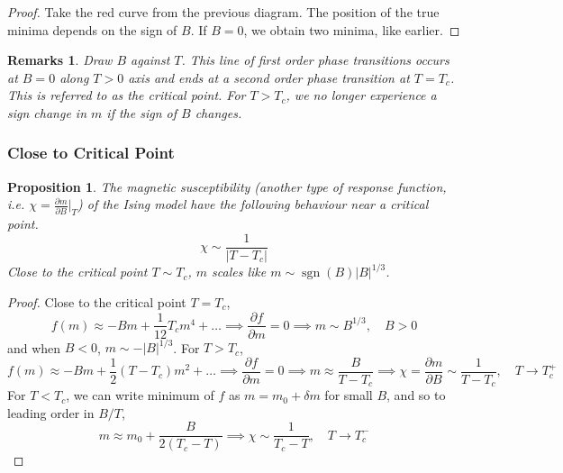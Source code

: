 \documentclass[a4paper]{article}
\DeclareMathOperator{\sgn}{sgn}
\newtheorem{remarks}{Remarks}[section]
\theoremstyle{new}
\newtheorem{prop}{Proposition}[section]
\begin{document}
\begin{proof}
Take the red curve from the previous diagram. The position of the true minima depends on the sign of $B$. If $B=0$, we obtain two minima, like earlier.
\end{proof}
\begin{remarks}
Draw $B$ against $T$. This line of first order phase transitions occurs at $B=0$ along $T>0$ axis and ends at a second order phase transition at $T = T_c$. This is referred to as the critical point. For $T>T_c$, we no longer experience a sign change in $m$ if the sign of $B$ changes.
\end{remarks}
\subsubsection{Close to Critical Point}
\begin{prop}
The magnetic susceptibility (another type of response function, i.e. $\chi=\frac{\partial m}{\partial B}|_T$) of the Ising model have the following behaviour near a critical point.
$$\chi\sim\frac{1}{|T-T_c|}$$
Close to the critical point $T\sim T_c$, $m$ scales like $m\sim\sgn(B)|B|^{1/3}$.
\end{prop}
\begin{proof}
Close to the critical point $T=T_c$,
$$f(m)\approx-Bm+\frac{1}{12}T_cm^4+\dots\implies \frac{\partial f}{\partial m}=0\implies m\sim B^{1/3},\quad B>0$$
and when $B<0$, $m\sim-|B|^{1/3}$. For $T>T_c$,
$$f(m)\approx-Bm+\frac{1}{2}(T-T_c)m^2+\dots\implies \frac{\partial f}{\partial m}=0\implies m\approx\frac{B}{T-T_c}\implies\chi=\frac{\partial m}{\partial B}\sim\frac{1}{T-T_c},\quad T\rightarrow T_c^+$$
For $T<T_c$, we can write minimum of $f$ as $m=m_0+\delta m$ for small $B$, and so to leading order in $B/T$, 
$$m\approx m_0+\frac{B}{2(T_c-T)}\implies\chi\sim\frac{1}{T_c-T},\quad T\rightarrow T_c^-$$
\end{proof}
\end{document}

